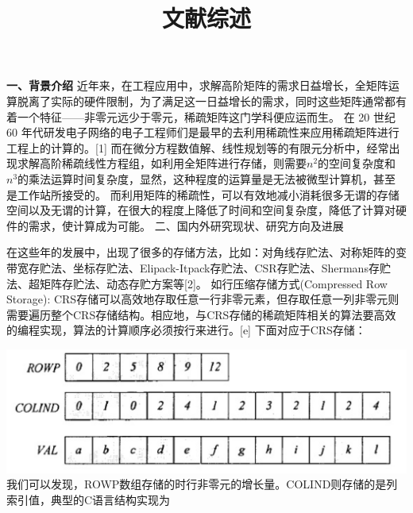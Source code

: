 \documentclass{article}
\begin{document}
  

\title{文献综述}
\date{}

\maketitle


\textbf{一、背景介绍}
      \qquad
\newline
      \qquad
      近年来，在工程应用中，求解高阶矩阵的需求日益增长，全矩阵运算脱离了实际的硬件限制，为了满足这一日益增长的需求，同时这些矩阵通常都有着一个特征——非零元远少于零元，稀疏矩阵这门学科便应运而生。
在 20 世纪 60 年代研发电子网络的电子工程师们是最早的去利用稀疏性来应用稀疏矩阵进行工程上的计算的。[1]
而在微分方程数值解、线性规划等的有限元分析中，经常出现求解高阶稀疏线性方程组，如利用全矩阵进行存储，则需要$n^2$的空间复杂度和$n^3$的乘法运算时间复杂度，显然，这种程度的运算量是无法被微型计算机，甚至是工作站所接受的。
而利用矩阵的稀疏性，可以有效地减小消耗很多无谓的存储空间以及无谓的计算，在很大的程度上降低了时间和空间复杂度，降低了计算对硬件的需求，使计算成为可能。
\newline
二、国内外研究现状、研究方向及进展\newline

在这些年的发展中，出现了很多的存储方法，比如：对角线存贮法、对称矩阵的变带宽存贮法、坐标存贮法、Elipack-Itpack存贮法、CSR存贮法、Shermans存贮法、超矩阵存贮法、动态存贮方案等[2]。
\newline
如行压缩存储方式(Compressed Row Storage):
CRS存储可以高效地存取任意一行非零元素，但存取任意一列非零元则需要遍历整个CRS存储结构。相应地，与CRS存储的稀疏矩阵相关的算法要高效的编程实现，算法的计算顺序必须按行来进行。[e]
下面对应于CRS存储：
\newline\newline\newline\newline\newline\newline\newline

\includegraphics[scale=0.25]{crs.png}
我们可以发现，ROWP数组存储的时行非零元的增长量。COLIND则存储的是列索引值，典型的C语言结构实现为\newline
\end{document}
